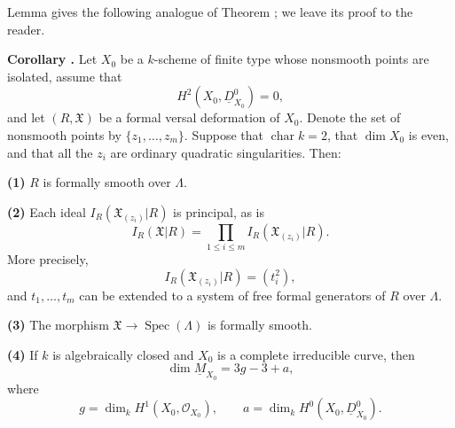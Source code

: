Lemma  gives the following analogue of Theorem ; we leave its
proof to the reader.

\par\medskip
\noindent\textbf{Corollary .}
Let $X_0$ be a $k$-scheme of finite type whose nonsmooth points are
isolated, assume that
\[
H^2(X_0,\underline D^0_{X_0})=0,
\]
and let $(R,\mathfrak X)$ be a formal versal deformation of $X_0$.
Denote the set of nonsmooth points by $\{z_1,\ldots,z_m\}$. Suppose
that $\operatorname{char}k=2$, that $\dim X_0$ is even, and that all
the $z_i$ are ordinary quadratic singularities. Then:

\smallskip
\noindent\textbf{(1)} $R$ is formally smooth over $\Lambda$.

\smallskip
\noindent\textbf{(2)} Each ideal
$I_R(\mathfrak X_{(z_i)}|R)$ is principal, as is
\[
I_R(\mathfrak X|R)
=\prod_{1\leq i\leq m}I_R(\mathfrak X_{(z_i)}|R).
\]
More precisely,
\[
I_R(\mathfrak X_{(z_i)}|R)=(t_i^2),
\]
and $t_1,\ldots,t_m$ can be extended to a system of free formal
generators of $R$ over $\Lambda$.

\smallskip
\noindent\textbf{(3)} The morphism
$\mathfrak X\longrightarrow\operatorname{Spec}(\Lambda)$ is formally
smooth.

\smallskip
\noindent\textbf{(4)} If $k$ is algebraically closed and $X_0$ is a
complete irreducible curve, then
\[
\dim\underline M_{X_0}=3g-3+a,
\]
where
\[
g=\dim_kH^1(X_0,\mathcal O_{X_0}),
\qquad
a=\dim_kH^0(X_0,\underline D^0_{X_0}).
\]
